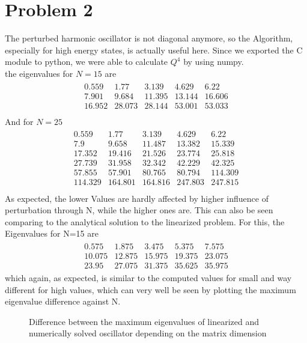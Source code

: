 \documentclass[12pt, a4paper]{article}
\begin{document}
  	\section*{Problem 2}
  	The perturbed harmonic oscillator is not diagonal anymore, so the Algorithm, especially for high energy states, is actually useful here. Since we exported the C module to python, we were able to calculate $Q^4$ by using numpy.
  	\\the eigenvalues for $N=15$ are
  	\begin{align}
	  	\begin{matrix}
		  	0.559&1.77&3.139&4.629&6.22\\
		  	7.901&9.684&11.395&13.144&16.606\\
		  	16.952&28.073&28.144&53.001&53.033\\
	  	\end{matrix}
	\end{align}
	And for $N=25$
	\begin{align}
	  	\begin{matrix}
	  		0.559&1.77&3.139&4.629&6.22\\
	  		7.9&9.658&11.487&13.382&15.339\\
	  		17.352&19.416&21.526&23.774&25.818\\
	  		27.739&31.958&32.342&42.229&42.325\\
	  		57.855&57.901&80.765&80.794&114.309\\
	  		114.329&164.801&164.816&247.803&247.815\\
	  	\end{matrix}
  	\end{align}
  	As expected, the lower Values are hardly affected by higher influence of perturbation through N, while the higher ones are. This can also be seen comparing to the analytical solution to the linearized problem. For this, the Eigenvalues for N=15 are
  	\begin{align}
  	\begin{matrix}
	  	0.575&1.875&3.475&5.375&7.575\\
	  	10.075&12.875&15.975&19.375&23.075\\
	  	23.95&27.075&31.375&35.625&35.975
  	\end{matrix}
  	\end{align}
  	which again, as expected, is similar to the computed values for small and way different for high values, which can very well be seen by plotting the maximum eigenvalue difference against N.
	\begin{figure}
	
	\caption{Difference between the maximum eigenvalues of linearized and numerically solved oscillator depending on the matrix dimension}
	\label{fig1}
	\end{figure}
\end{document}
